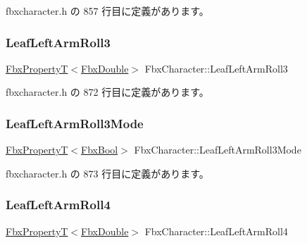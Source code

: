  fbxcharacter.\+h の 857 行目に定義があります。

\mbox{\label{class_fbx_character_a22a6f5684392e9a2be33a58f8d1014a2}} 
\subsubsection{\texorpdfstring{Leaf\+Left\+Arm\+Roll3}{LeafLeftArmRoll3}}
{\footnotesize\ttfamily \hyperlink{class_fbx_property_t}{Fbx\+PropertyT}$<$\hyperlink{fbxtypes_8h_a171e72a1c46fc15c1a6c9c31948c1c5b}{Fbx\+Double}$>$ Fbx\+Character\+::\+Leaf\+Left\+Arm\+Roll3}



 fbxcharacter.\+h の 872 行目に定義があります。

\mbox{\label{class_fbx_character_a43e2930b7cc27333684f4741f064471a}} 
\subsubsection{\texorpdfstring{Leaf\+Left\+Arm\+Roll3\+Mode}{LeafLeftArmRoll3Mode}}
{\footnotesize\ttfamily \hyperlink{class_fbx_property_t}{Fbx\+PropertyT}$<$\hyperlink{fbxtypes_8h_a92e0562b2fe33e76a242f498b362262e}{Fbx\+Bool}$>$ Fbx\+Character\+::\+Leaf\+Left\+Arm\+Roll3\+Mode}



 fbxcharacter.\+h の 873 行目に定義があります。

\mbox{\label{class_fbx_character_a71eeeaeb6d7590b797a721b0ea597770}} 
\subsubsection{\texorpdfstring{Leaf\+Left\+Arm\+Roll4}{LeafLeftArmRoll4}}
{\footnotesize\ttfamily \hyperlink{class_fbx_property_t}{Fbx\+PropertyT}$<$\hyperlink{fbxtypes_8h_a171e72a1c46fc15c1a6c9c31948c1c5b}{Fbx\+Double}$>$ Fbx\+Character\+::\+Leaf\+Left\+Arm\+Roll4}



